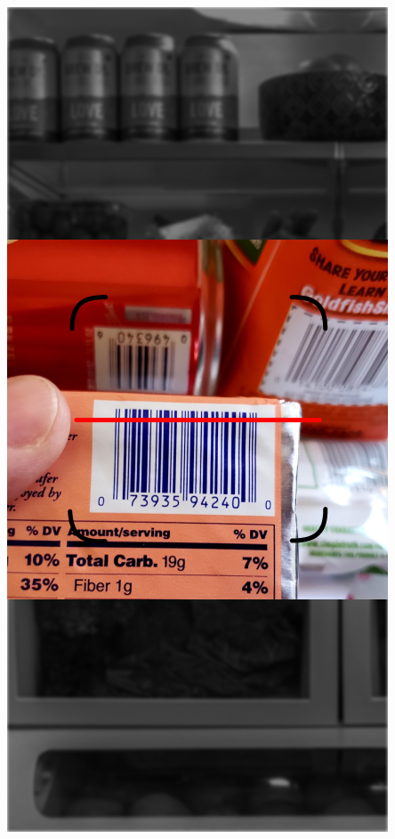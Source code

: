 \documentclass{article}
\begin{document}
\includegraphics[height = \textwidth/2]{images/Scan.png}
\end{document}
